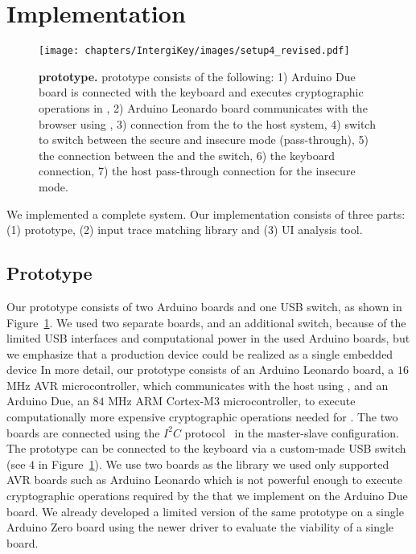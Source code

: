 \section{Implementation}
\label{sec:implementation_IK}

\begin{figure}[t]
  \centering
    \texttt{[image: chapters/IntergiKey/images/setup4\_revised.pdf]}
    \caption[\device]{\textbf{\device prototype.} \device prototype consists of the following: 1) Arduino Due board is connected with the keyboard and executes cryptographic operations in \tls, 2) Arduino Leonardo board communicates with the browser using \webusb, 3) \usb connection from the \device to the host system, 4) \usb switch to switch between the secure and insecure mode (pass-through), 5) the connection between the \device and the \usb switch, 6) the keyboard connection, 7) the host pass-through connection for the insecure mode.}
    \label{fig:setup}
\end{figure}

We implemented a complete \name system. Our implementation consists of three parts: (1) \device prototype, (2) \server input trace matching library and (3) \tool UI analysis tool. 

\subsection{\device Prototype} 

Our \device prototype consists of two Arduino boards and one USB switch, as shown in Figure~\ref{fig:setup}. We used two separate boards, and an additional switch, because of the limited USB interfaces and computational power in the used Arduino boards, but we emphasize that a production device could be realized as a single embedded device
In more detail, our \device prototype consists of an Arduino Leonardo board, a $16$ MHz AVR microcontroller, which communicates with the host using \webusb, and an Arduino Due, an $84$ MHz ARM Cortex-M3 microcontroller, to execute computationally more expensive cryptographic operations needed for \tls. The two boards are connected using the $I^2C$ protocol~\cite{i2c} in the master-slave configuration. The prototype can be connected to the keyboard via a custom-made USB switch (see $4$ in Figure~\ref{fig:setup}). We use two boards as the \webusb library we used only supported AVR boards such as Arduino Leonardo which is not powerful enough to execute cryptographic operations required by the \tls that we implement on the Arduino Due board. We already developed a limited version of the same prototype on a single Arduino Zero board using the newer driver to evaluate the viability of a single board.


